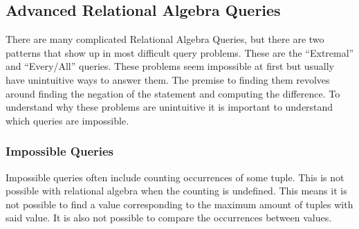 \documentclass{report}
\begin{document}
         

\subsection{Advanced Relational Algebra Queries}
There are many complicated Relational Algebra Queries, but there are two patterns that show up in most difficult query problems. These are the ``Extremal'' and ``Every/All'' queries. These problems seem impossible at first but usually have unintuitive ways to answer them. The premise to finding them revolves around finding the negation of the statement and computing the difference. To understand why these problems are unintuitive it is important to understand which queries are impossible. 

\subsubsection{Impossible Queries}

Impossible queries often include counting occurrences of some tuple. This is not possible with relational algebra when the counting is undefined. This means it is not possible to find a value corresponding to the maximum amount of tuples with said value. It is also not possible to compare the occurrences between values. 
\vspace{.2cm}
 
\end{document}
